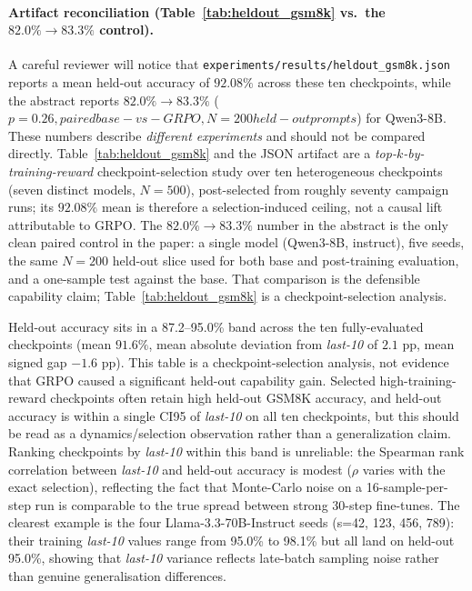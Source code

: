\paragraph{Artifact reconciliation (Table~\ref{tab:heldout_gsm8k} vs.\ the $82.0\%\!\to\!83.3\%$ control).}
A careful reviewer will notice that \texttt{experiments/results/heldout\_gsm8k.json}
reports a mean held-out accuracy of $92.08\%$ across these ten checkpoints,
while the abstract reports $82.0\%\!\to\!83.3\%$ ($p=0.26, paired base-vs-GRPO, N=200 held-out prompts $) for Qwen3-8B.
These numbers describe \emph{different experiments} and should not be compared
directly.  Table~\ref{tab:heldout_gsm8k} and the JSON artifact are a
\emph{top-$k$-by-training-reward} checkpoint-selection study over ten
heterogeneous checkpoints (seven distinct models, $N=500$), post-selected from
roughly seventy campaign runs; its $92.08\%$ mean is therefore a
selection-induced ceiling, not a causal lift attributable to GRPO.  The
$82.0\%\!\to\!83.3\%$ number in the abstract is the only clean paired control
in the paper: a single model (Qwen3-8B, instruct), five seeds, the same
$N{=}200$ held-out slice used for both base and post-training evaluation, and
a one-sample test against the base.  That comparison is the defensible
capability claim; Table~\ref{tab:heldout_gsm8k} is a checkpoint-selection analysis.

\noindent Held-out accuracy sits in a 87.2--95.0\% band across the
ten fully-evaluated checkpoints (mean $91.6\%$, mean absolute deviation
from \emph{last-10} of $2.1$ pp, mean signed gap $-1.6$ pp).  This table is a
checkpoint-selection analysis, not evidence that GRPO caused a significant
held-out capability gain.  Selected high-training-reward checkpoints often
retain high held-out GSM8K accuracy, and held-out accuracy is within a single
CI95 of \emph{last-10} on all ten checkpoints, but this should be read as a
dynamics/selection observation rather than a generalization claim.  Ranking
checkpoints by \emph{last-10} within this band is
unreliable: the Spearman rank correlation between \emph{last-10} and
held-out accuracy is modest ($\rho$ varies with the exact selection), reflecting
the fact that Monte-Carlo noise on a 16-sample-per-step run is comparable to the
true spread between strong 30-step fine-tunes. The clearest example is the four
Llama-3.3-70B-Instruct seeds (s=42, 123, 456, 789): their training
\emph{last-10} values range from 95.0\% to 98.1\% but all land on held-out
95.0\%, showing that \emph{last-10} variance reflects late-batch sampling noise
rather than genuine generalisation differences.

